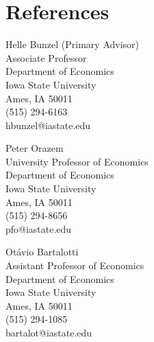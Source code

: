 \documentclass[letterpaper]{article}
\begin{document}
\section*{References}
\begin{minipage}{0.45\linewidth}
 Helle Bunzel (Primary Advisor) \\
    Associate Professor\\
    Department of Economics\\
    Iowa State University\\
    Ames, IA 50011\\
    (515) 294-6163\\
    hbunzel@iastate.edu
\end{minipage}
\begin{minipage}{0.45\linewidth}
Peter Orazem\\
    University Professor of Economics\\
    Department of Economics\\
    Iowa State University\\
    Ames, IA 50011\\
    (515) 294-8656\\
    pfo@iastate.edu
\end{minipage}

\bigskip

\begin{minipage}{0.45\linewidth}
Ot\'avio Bartalotti\\
    Assistant Professor of Economics\\
    Department of Economics\\
    Iowa State University\\
    Ames, IA 50011\\
    (515) 294-1085 \\
    bartalot@iastate.edu

\end{minipage}
\bigskip
\end{document}
